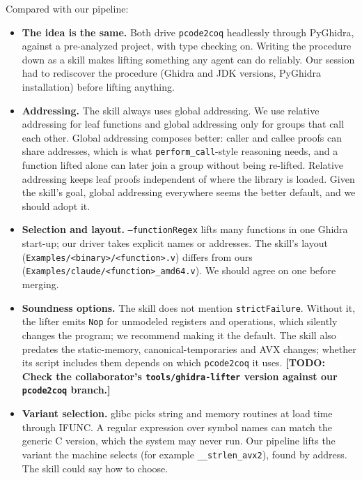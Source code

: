 \documentclass[11pt]{article}
\newcommand{\todo}[1]{\textbf{[TODO: #1]}}
\newcommand{\code}[1]{\texttt{#1}}
\begin{document}
Compared with our pipeline:
\begin{itemize}
\item \textbf{The idea is the same.}  Both drive \code{pcode2coq}
      headlessly through PyGhidra, against a pre-analyzed project, with type
      checking on.  Writing the procedure down as a skill makes lifting
      something any agent can do reliably.  Our session had to rediscover
      the procedure (Ghidra and JDK versions, PyGhidra installation) before
      lifting anything.
\item \textbf{Addressing.}  The skill always uses global addressing.  We use
      relative addressing for leaf functions and global addressing only for
      groups that call each other.  Global addressing composes better:
      caller and callee proofs can share addresses, which is what
      \code{perform\_call}-style reasoning needs, and a function lifted
      alone can later join a group without being re-lifted.  Relative
      addressing keeps leaf proofs independent of where the library is
      loaded.  Given the skill's goal, global addressing everywhere seems
      the better default, and we should adopt it.
\item \textbf{Selection and layout.}  \code{--functionRegex} lifts many
      functions in one Ghidra start-up; our driver takes explicit names or
      addresses.  The skill's layout
      (\code{Examples/<binary>/<function>.v}) differs from ours
      (\code{Examples/claude/<function>\_amd64.v}).  We should agree on one
      before merging.
\item \textbf{Soundness options.}  The skill does not mention
      \code{strictFailure}.  Without it, the lifter emits \code{Nop} for
      unmodeled registers and operations, which silently changes the
      program; we recommend making it the default.  The skill also predates
      the static-memory, canonical-temporaries and AVX changes; whether its
      script includes them depends on which \code{pcode2coq} it uses.
      \todo{Check the collaborator's \code{tools/ghidra-lifter} version
      against our \code{pcode2coq} branch.}
\item \textbf{Variant selection.}  glibc picks string and memory routines
      at load time through IFUNC.  A regular expression over symbol names
      can match the generic C version, which the system may never run.  Our
      pipeline lifts the variant the machine selects (for example
      \code{\_\_strlen\_avx2}), found by address.  The skill could say how
      to choose.
\end{itemize}
\end{document}
